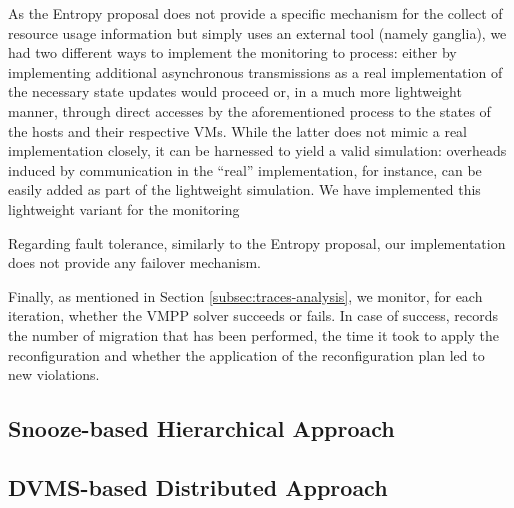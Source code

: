 
As the Entropy proposal does not provide a specific mechanism for the
collect of resource usage information but simply uses an external tool
(namely ganglia), we had two different ways to implement the monitoring to
process:  either by implementing additional asynchronous transmissions
as a real implementation of the necessary state updates would proceed
or, in a much more lightweight manner, through direct accesses by the
aforementioned process to the states of the hosts and their respective
VMs. While the latter does not mimic a real implementation closely, it
can be harnessed to yield a valid simulation: overheads induced by
communication in the ``real'' implementation, for instance, can be
easily added as part of the lightweight simulation. We have
implemented this lightweight variant for the monitoring

Regarding fault tolerance, similarly to the Entropy proposal, our
implementation does not provide any failover mechanism.

Finally, as mentioned in Section \ref{subsec:traces-analysis}, we monitor, for each iteration,
whether the VMPP solver succeeds or fails. In case of success, \vmps
records the number of migration that has been performed, the time it
took to apply the reconfiguration and whether
the application of the reconfiguration plan led to new violations.

\subsection{Snooze-based Hierarchical Approach}
\label{subsec:snooze}


\subsection{DVMS-based Distributed Approach}
\label{subsec:dvms}


